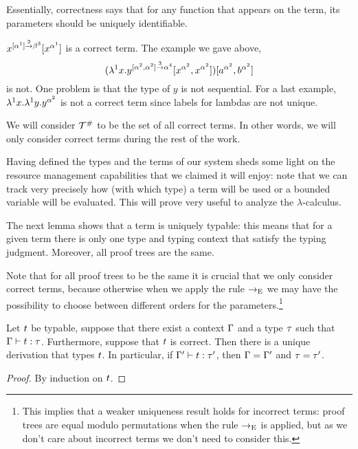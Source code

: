 Essentially, correctness says that for
any function that appears on the term, its parameters should be uniquely identifiable.

\begin{example}
$x^{[\alpha^1] \overset{2}{\to} \beta^3}[x^{\alpha^1}]$ is a correct term.
The example we gave above,
\[(\lambda^{1} x. y^{[\alpha^2, \alpha^2] \overset{3}{\to} \alpha^4} [x^{\alpha^2}, x^{\alpha^2}])
[a^{\alpha^2}, b^{\alpha^2}]\]
is not.
One problem is that the type of $y$ is not sequential.
For a last example,
$\lambda^{1} x. \lambda^{1} y. y^{\alpha^2}$
is not a correct term since labels for lambdas are not unique.
\end{example}

\begin{remark}
We will consider $\mathcal{T}^{\mathtt{\#}}$ to be the set of all correct terms.
In other words, we will only consider correct terms during the rest of the work.
\end{remark}


Having defined the types and the terms of our system
sheds some light on the resource management capabilities that we claimed it will enjoy:
note that we can track very precisely how (\ie with which type) a term will be used or
a bounded variable will be evaluated.
This will prove very useful to analyze the $\lambda$-calculus.

The next lemma shows that a term is uniquely typable: this means that for a given term
there is only one type and typing context that satisfy the typing judgment.
Moreover, all proof trees are the same.

Note that for all proof trees to be the same it is crucial that
we only consider correct terms, because otherwise when we apply the rule
$\to_{\mathrm{E}}$ we may have the possibility to choose between different orders for the
parameters.\footnote{This implies that a weaker uniqueness result holds for
incorrect terms: proof trees are equal modulo permutations when the rule $\to_{\mathrm{E}}$
is applied, but as we don't care about incorrect terms we don't need to consider this.}

\begin{lemma}
Let $t$ be typable, \ie suppose that there exist a context $\Gamma$ and a type $\tau$ such that $\Gamma \vdash t : \tau$. Furthermore, suppose that $t$ is correct.
Then there is a unique derivation that types $t$.
In particular, if $\Gamma' \vdash t : \tau'$, then $\Gamma = \Gamma'$ and $\tau = \tau'$.
\end{lemma}
\begin{proof}
By induction on $t$.
\end{proof}


